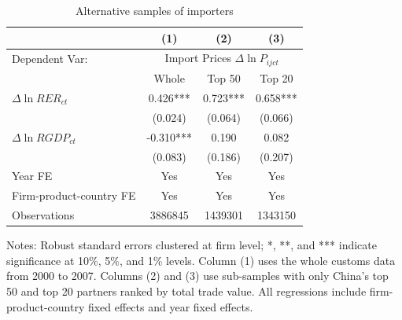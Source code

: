 \setcounter{table}{0}

\renewcommand{\thetable}{A\arabic{table}}

\begin{table}[htbp]
	\centering
	\caption{Alternative samples of importers}
        \setlength{\tabcolsep}{7mm}
	\begin{threeparttable}
		\begin{tabular}{lccc}
			\toprule
			& (1)   & (2)   & (3)  \\
			\midrule
			Dependent Var: & \multicolumn{3}{c}{ Import Prices $\Delta \ln P_{ijct}$} \\
			& Whole & Top 50 & Top 20 \\
			\midrule
			$\Delta \ln RER_{ct}$ & 0.426***  & 0.723*** & 0.658*** \\
			& (0.024)  & (0.064) & (0.066) \\
			$\Delta \ln RGDP_{ct}$ & -0.310***  & 0.190 & 0.082 \\
			& (0.083)  & (0.186) & (0.207) \\
                \midrule
			Year FE  & Yes   & Yes   & Yes  \\
			Firm-product-country FE & Yes   & Yes   & Yes  \\
			Observations & 3886845  & 1439301 & 1343150 \\
			\bottomrule
		\end{tabular}
		\begin{tablenotes}
			\footnotesize
			\item Notes: Robust standard errors clustered at firm level;  *, **, and *** indicate significance at 10\%, 5\%, and 1\% levels. Column (1) uses the whole customs data from 2000 to 2007. Columns (2) and (3) use sub-samples with only China's top 50 and top 20 partners ranked by total trade value. All regressions include firm-product-country fixed effects and year fixed effects. 
		\end{tablenotes}
	\end{threeparttable}
	\label{tab.alt.imp}
\end{table}

